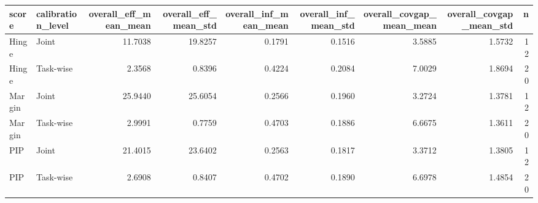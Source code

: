 \begin{tabular}{llrrrrrrr}
\toprule
score & calibration_level & overall_eff_mean_mean & overall_eff_mean_std & overall_inf_mean_mean & overall_inf_mean_std & overall_covgap_mean_mean & overall_covgap_mean_std & n \\
\midrule
Hinge & Joint & 11.7038 & 19.8257 & 0.1791 & 0.1516 & 3.5885 & 1.5732 & 12 \\
Hinge & Task-wise & 2.3568 & 0.8396 & 0.4224 & 0.2084 & 7.0029 & 1.8694 & 20 \\
Margin & Joint & 25.9440 & 25.6054 & 0.2566 & 0.1960 & 3.2724 & 1.3781 & 12 \\
Margin & Task-wise & 2.9991 & 0.7759 & 0.4703 & 0.1886 & 6.6675 & 1.3611 & 20 \\
PIP & Joint & 21.4015 & 23.6402 & 0.2563 & 0.1817 & 3.3712 & 1.3805 & 12 \\
PIP & Task-wise & 2.6908 & 0.8407 & 0.4702 & 0.1890 & 6.6978 & 1.4854 & 20 \\
\bottomrule
\end{tabular}
